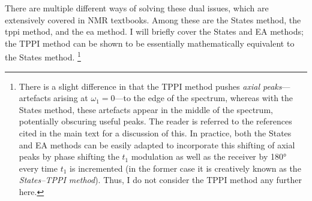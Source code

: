 There are multiple different ways of solving these dual issues, which are extensively covered in NMR textbooks.\autocite{Ernst1987,Keeler2010,Levitt2008,Claridge2016,Cavanagh2007}
Among these are the States method\autocite{States1982JMR}, the \ac{tppi} method\autocite{Marion1983BBRC}, and the \ac{ea} method.
I will briefly cover the States and EA methods; the TPPI method can be shown to be essentially mathematically equivalent to the States method\autocite{Keeler1985JMR}.%
\footnote{There is a slight difference in that the TPPI method pushes \textit{axial peaks}---artefacts arising at $\omega_1 = 0$---to the edge of the spectrum, whereas with the States method, these artefacts appear in the middle of the spectrum, potentially obscuring useful peaks. The reader is referred to the references cited in the main text for a discussion of this.
In practice, both the States and EA methods can be easily adapted to incorporate this shifting of axial peaks by phase shifting the $t_1$ modulation as well as the receiver by \ang{180} every time $t_1$ is incremented (in the former case it is creatively known as the \textit{States--TPPI method}).
Thus, I do not consider the TPPI method any further here.}

